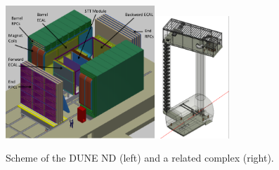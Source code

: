 \begin{figure}
\caption{Scheme of the DUNE ND (left) and a related complex (right).}
\label{fig:nearDetector}
\centering
\includegraphics[width=0.50\textwidth, keepaspectratio=true]{figs/nearDetector.png}\includegraphics[width=0.25\textwidth, keepaspectratio=true]{figs/nearDetector_project.png}
\end{figure}
